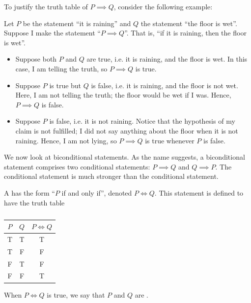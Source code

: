 To justify the truth table of $P \implies Q$, consider the following example:
\begin{example}
    Let $P$ be the statement ``it is raining'' and $Q$ the statement ``the floor is wet''. Suppose I make the statement ``$P \implies Q$''. That is, ``if it is raining, then the floor is wet''.

    \begin{itemize}
        \item Suppose both $P$ and $Q$ are true, i.e. it is raining, and the floor is wet. In this case, I am telling the truth, so $P \implies Q$ is true.
        \item Suppose $P$ is true but $Q$ is false, i.e. it is raining, and the floor is not wet. Here, I am not telling the truth; the floor would be wet if I was. Hence, $P \implies Q$ is false.
        \item Suppose $P$ is false, i.e. it is not raining. Notice that the hypothesis of my claim is not fulfilled; I did not say anything about the floor when it is not raining. Hence, I am not lying, so $P \implies Q$ is true whenever $P$ is false.
    \end{itemize}
\end{example}

We now look at biconditional statements. As the name suggests, a biconditional statement comprises two conditional statements: $P \implies Q$ and $Q \implies P$. The conditional statement is much stronger than the conditional statement.

\begin{definition}
    A  has the form ``$P$ if and only if'', denoted $P \iff Q$. This statement is defined to have the truth table
    \begin{table}[H]
        \centering
        \begin{tabular}{|c|c|c|}
        \hline
        $P$ & $Q$ & $P \iff Q$ \\ \hline\hline
        T & T & T \\ \hline
        T & F & F \\ \hline
        F & T & F \\ \hline
        F & F & T \\ \hline
        \end{tabular}
        \caption{}
    \end{table}

    When $P \iff Q$ is true, we say that $P$ and $Q$ are .
\end{definition}

